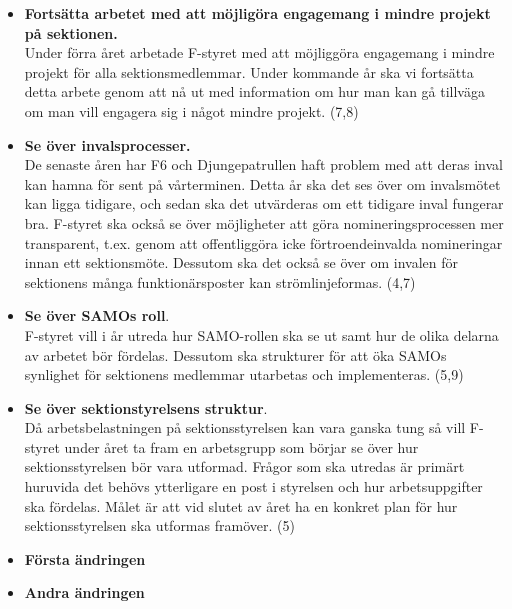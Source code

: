 \documentclass[a4paper]{article}
\begin{document}
\begin{itemize}
\item \textbf{Fortsätta arbetet med att möjligöra engagemang i mindre projekt på sektionen.}\\
Under förra året arbetade F-styret med att möjliggöra engagemang i mindre projekt för alla sektionsmedlemmar. Under kommande år ska vi fortsätta detta arbete genom att nå ut med information om hur man kan gå tillväga om man vill engagera sig i något mindre projekt. (7,8)


\item \textbf{Se över invalsprocesser.} \\
De senaste åren har F6 och Djungepatrullen haft problem med att deras inval kan hamna för sent på vårterminen. Detta år ska det ses över om invalsmötet kan ligga tidigare, och sedan ska det utvärderas om ett tidigare inval fungerar bra. F-styret ska också se över möjligheter att göra nomineringsprocessen mer transparent, t.ex. genom att offentliggöra icke förtroendeinvalda nomineringar innan ett sektionsmöte. Dessutom ska det också se över om invalen för sektionens många funktionärsposter kan strömlinjeformas. (4,7)%

\item \textbf{Se över SAMOs roll}.\\
F-styret vill i år utreda hur SAMO-rollen ska se ut samt hur de olika delarna av arbetet bör fördelas. Dessutom ska strukturer för att öka SAMOs synlighet för sektionens medlemmar utarbetas och implementeras. (5,9) %

\item \textbf{Se över sektionstyrelsens struktur}.\\
Då arbetsbelastningen på sektionsstyrelsen kan vara ganska tung så vill F-styret under året ta fram en arbetsgrupp som börjar se över hur sektionsstyrelsen bör vara utformad. Frågor som ska utredas är primärt huruvida det behövs ytterligare en post i styrelsen och hur arbetsuppgifter ska fördelas. Målet är att vid slutet av året ha en konkret plan för hur sektionsstyrelsen ska utformas framöver. (5)

\item \textbf{Första ändringen}

\item \textbf{Andra ändringen}

\end{itemize}
\end{document}
